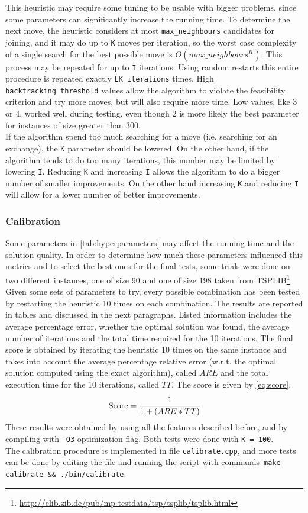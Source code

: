 This heuristic may require some tuning to be usable with bigger problems, since some parameters can significantly increase the running time. To determine the next move, the heuristic considers at most \texttt{max\_neighbours} candidates for joining, and it may do up to \texttt{K} moves per iteration, so the worst case complexity of a single search for the best possible move is $O(max\_neighbours^K)$. This process may be repeated for up to \texttt{I} iterations. Using random restarts this entire procedure is repeated exactly \texttt{LK\_iterations} times. High \texttt{back\-track\-ing\_threshold} values allow the algorithm to violate the feasibility criterion and try more moves, but will also require more time. Low values, like 3 or 4, worked well during testing, even though 2 is more likely the best parameter for instances of size greater than 300.\\
If the algorithm spend too much searching for a move (i.e. searching for an exchange), the \texttt{K} parameter should be lowered. On the other hand, if the algorithm tends to do too many iterations, this number may be limited by lowering \texttt{I}. Reducing \texttt{K} and increasing \texttt{I} allows the algorithm to do a bigger number of smaller improvements. On the other hand increasing \texttt{K} and reducing \texttt{I} will allow for a lower number of better improvements.

\subsubsection{Calibration}
Some parameters in \cref{tab:hyperparameters} may affect the running time and the solution quality. In order to determine how much these parameters influenced this metrics and to select the best ones for the final tests, some trials were done on two different instances, one of size 90 and one of size 198 taken from TSPLIB\footnote{\url{http://elib.zib.de/pub/mp-testdata/tsp/tsplib/tsplib.html}}. Given some sets of parameters to try, every possible combination has been tested by restarting the heuristic 10 times on each combination. The results are reported in tables and discussed in the next paragraphs. Listed information includes the average percentage error, whether the optimal solution was found, the average number of iterations and the total time required for the 10 iterations. The final score is obtained by iterating the heuristic 10 times on the same instance and takes into account the average percentage relative error (w.r.t. the optimal solution computed using the exact algorithm), called $ARE$ and the total execution time for the 10 iterations, called $TT$. The score is given by \cref{eq:score}.
\begin{equation}
	\text{Score} = \cfrac{1}{1 + (ARE * TT)}
	\label{eq:score}
\end{equation}
These results were obtained by using all the features described before, and by compiling with \texttt{-O3} optimization flag. Both tests were done with \texttt{K = 100}.\\
The calibration procedure is implemented in file \texttt{calibrate.cpp}, and more tests can be done by editing the file and running the script with commands~\texttt{make calibrate \&\& ./bin/calibrate}.

